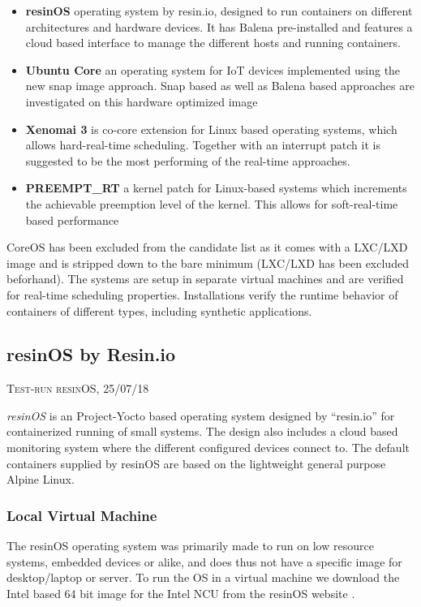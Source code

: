 \documentclass[]{scrartcl}
\begin{document}
\begin{itemize}
	\item \textbf{resinOS} operating system by resin.io, designed to run containers on different architectures and hardware devices. It has Balena pre-installed and features a cloud based interface to manage the different hosts and running containers.
	\item \textbf{Ubuntu Core} an operating system for IoT devices implemented using the new snap image approach. Snap based as well as Balena based approaches are investigated on this hardware optimized image
	\item \textbf{Xenomai 3} is co-core extension for Linux based operating systems, which allows hard-real-time scheduling. Together with an interrupt patch it is suggested to be the most performing of the real-time approaches.
	\item \textbf{PREEMPT\_RT} a kernel patch for Linux-based systems which increments the achievable preemption level of the kernel. This allows for soft-real-time based performance
\end{itemize}

CoreOS has been excluded from the candidate list as it comes with a LXC/LXD image and is stripped down to the bare minimum (LXC/LXD has been excluded beforhand). The systems are setup in separate virtual machines and are verified for real-time scheduling properties. Installations verify the runtime behavior of containers of different types, including synthetic applications.

\subsection{resinOS by Resin.io}

{\small\textsc{Test-run resinOS, 25/07/18} \bigskip}

\textit{resinOS} is an Project-Yocto based operating system designed by ``resin.io'' for containerized running of small systems. The design also includes a cloud based monitoring system where the different configured devices connect to. The default containers supplied by resinOS are based on the lightweight general purpose Alpine Linux.

\subsubsection{Local Virtual Machine}

The resinOS operating system was primarily made to run on low resource systems, embedded devices or alike, and does thus not have a specific image for desktop/laptop or server. To run the OS in a virtual machine we download the Intel based 64 bit image for the Intel NCU from the resinOS website \cite{resin01}.
\end{document}
